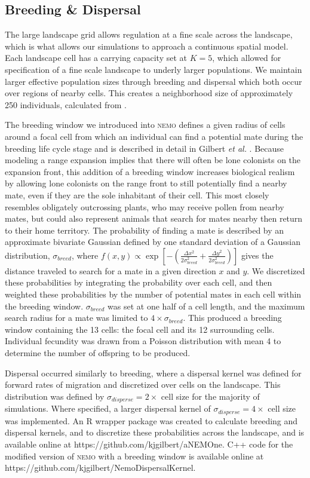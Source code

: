 \subsection{Breeding \& Dispersal}
The large landscape grid allows regulation at a fine scale across the landscape, which is what allows our simulations to approach a continuous spatial model. Each landscape cell has a carrying capacity set at $K = 5$, which allowed for specification of a fine scale landscape to underly larger populations. We maintain larger effective population sizes through breeding and dispersal which both occur over regions of nearby cells. This creates a neighborhood size of approximately 250 individuals, calculated from \citet{Wright:1946}. 

The breeding window we introduced into \textsc{nemo} defines a given radius of cells around a focal cell from which an individual can find a potential mate during the breeding life cycle stage and is described in detail in Gilbert \emph{et al.} . Because modeling a range expansion implies that there will often be lone colonists on the expansion front, this addition of a breeding window increases biological realism by allowing lone colonists on the range front to still potentially find a nearby mate, even if they are the sole inhabitant of their cell. This most closely resembles obligately outcrossing plants, who may receive pollen from nearby mates, but could also represent animals that search for mates nearby then return to their home territory. The probability of finding a mate is described by an approximate bivariate Gaussian defined by one standard deviation of a Gaussian distribution, $\sigma_{breed}$, where $f(x,y) \propto \exp{[-(\frac{\Delta x^2}{2\sigma_{breed}^2}+\frac{\Delta y^2}{2\sigma_{breed}^2})]}$ gives the distance traveled to search for a mate in a given direction $x$ and $y$. We discretized these probabilities by integrating the probability over each cell, and then weighted these probabilities by the number of potential mates in each cell within the breeding window. $\sigma_{breed}$ was set at one half of a cell length, and the maximum search radius for a mate was limited to $4\times\sigma_{breed}$. This produced a breeding window containing the 13 cells: the focal cell and its 12 surrounding cells. Individual fecundity was drawn from a Poisson distribution with mean 4 to determine the number of offspring to be produced.

Dispersal occurred similarly to breeding, where a dispersal kernel was defined for forward rates of migration and discretized over cells on the landscape. This distribution was defined by $\sigma_{disperse} = 2\times$ cell size for the majority of simulations. Where specified, a larger dispersal kernel of $\sigma_{disperse} = 4\times$ cell size was implemented. An R wrapper package was created to calculate breeding and dispersal kernels, and to discretize these probabilities across the landscape, and is available online at https://github.com/kjgilbert/aNEMOne. C++ code for the modified version of \textsc{nemo} with a breeding window is available online at https://github.com/kjgilbert/NemoDispersalKernel.

